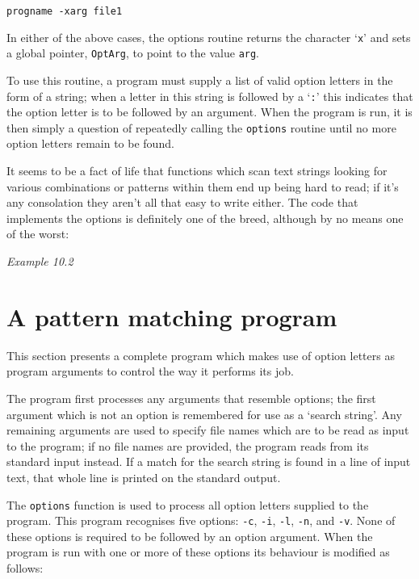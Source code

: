  \begin{Verbatim}
progname -xarg file1
\end{Verbatim}

  In either of the above cases, the options routine returns the character
   `\texttt{x}' and sets a global pointer, \texttt{OptArg}, to
   point to the value \texttt{arg}.


  To use this routine, a program must supply a list of valid option letters
   in the form of a string; when a letter in this string is followed by
   a `\texttt{:}' this indicates that the option letter is to be
   followed by an argument. When the program is run, it is then simply
   a question of repeatedly calling the \texttt{options} routine until no
   more option letters remain to be found.


  It seems to be a fact of life that functions which scan text strings
   looking for various combinations or patterns within them end up being hard
   to read; if it's any consolation they aren't all that easy to write either.
   The code that implements the options is definitely one of the breed,
   although by no means one of the worst:


  \begin{center}\textit{Example 10.2}\end{center}


 
        \section{A pattern matching program}
        

  

  This section presents a complete program which makes use of option letters
   as program arguments to control the way it performs its job.


  The program first processes any arguments that resemble options; the first
   argument which is not an option is remembered for use as a `search
   string'. Any remaining arguments are used to specify file names which are
   to be read as input to the program; if no file names are provided, the
   program reads from its standard input instead. If a match for the search
   string is found in a line of input text, that whole line is printed on the
   standard output.


  The \texttt{options} function is used to process all option letters
   supplied to the program. This program recognises five options:
   \texttt{-c}, \texttt{-i}, \texttt{-l}, \texttt{-n}, and
   \texttt{-v}. None of these options is required to be followed by an
   option argument. When the program is run with one or more of these options
   its behaviour is modified as follows:



